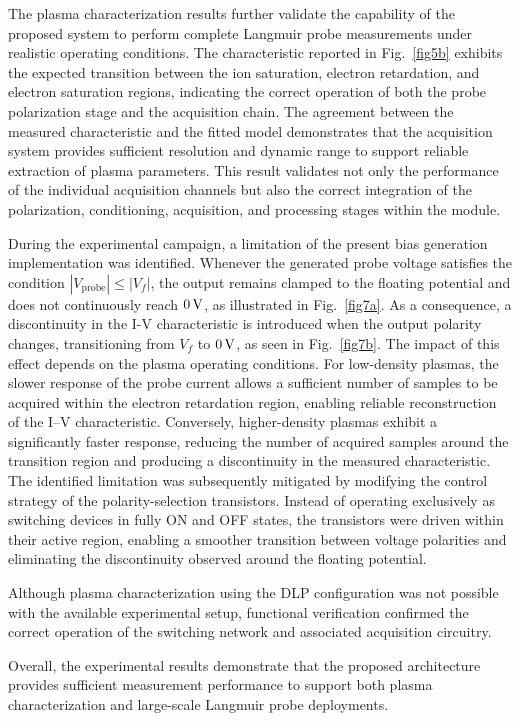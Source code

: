 The plasma characterization results further validate the capability of the proposed system to perform complete Langmuir probe measurements under realistic operating conditions. The characteristic reported in Fig.~\ref{fig5b} exhibits the expected transition between the ion saturation, electron retardation, and electron saturation regions, indicating the correct operation of both the probe polarization stage and the acquisition chain. The agreement between the measured characteristic and the fitted model demonstrates that the acquisition system provides sufficient resolution and dynamic range to support reliable extraction of plasma parameters. This result validates not only the performance of the individual acquisition channels but also the correct integration of the polarization, conditioning, acquisition, and processing stages within the module.

During the experimental campaign, a limitation of the present bias generation implementation was identified. Whenever the generated probe voltage satisfies the condition $|V_{\mathrm{probe}}| \leq |V_f|$, the output remains clamped to the floating potential and does not continuously reach $0 \, \mathrm{V}$, as illustrated in Fig.~\ref{fig7a}. As a consequence, a discontinuity in the I-V characteristic is introduced when the output polarity changes, transitioning from $V_f$ to $0 \, \mathrm{V}$, as seen in Fig.~\ref{fig7b}. The impact of this effect depends on the plasma operating conditions. For low-density plasmas, the slower response of the probe current allows a sufficient number of samples to be acquired within the electron retardation region, enabling reliable reconstruction of the I--V characteristic. Conversely, higher-density plasmas exhibit a significantly faster response, reducing the number of acquired samples around the transition region and producing a discontinuity in the measured characteristic. The identified limitation was subsequently mitigated by modifying the control strategy of the polarity-selection transistors. Instead of operating exclusively as switching devices in fully ON and OFF states, the transistors were driven within their active region, enabling a smoother transition between voltage polarities and eliminating the discontinuity observed around the floating potential.

Although plasma characterization using the DLP configuration was not possible with the available experimental setup, functional verification confirmed the correct operation of the switching network and associated acquisition circuitry.

Overall, the experimental results demonstrate that the proposed architecture provides sufficient measurement performance to support both plasma characterization and large-scale Langmuir probe deployments.